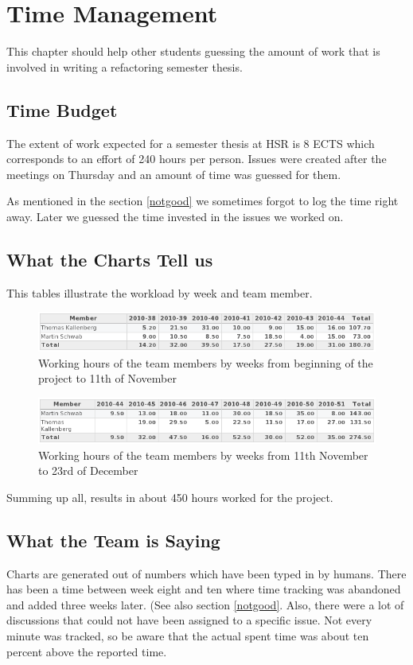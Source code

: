 \chapter{Time Management}
\thispagestyle{fancy}
This chapter should help other students guessing the amount of work that is 
involved in writing a refactoring semester thesis.

\section{Time Budget}
The extent of work expected for a semester thesis at HSR is 8 ECTS which 
corresponds to an effort of 240 hours per person. Issues were created after 
the meetings on Thursday and an amount of time was guessed for them.

As mentioned in the section \ref{notgood} we sometimes forgot to log the time
right away. Later we guessed the time invested in the issues we worked on.

\section{What the Charts Tell us}
This tables illustrate the workload by week and team member.

\begin{figure}[h]
\includegraphics[width=1\textwidth]{images/timetable1.png}
\caption{Working hours of the team members by weeks from beginning of the
project to 11th of November}
\label{timetable1}
\end{figure}

\begin{figure}[h]
\includegraphics[width=1\textwidth]{images/timetable2.png}
\caption{Working hours of the team members by weeks from 11th November to 23rd
of December}
\label{timetable2}
\end{figure}

Summing up all, results in about 450 hours worked for the project.

\section{What the Team is Saying}
Charts are generated out of numbers which have been typed in by humans. There 
has been a time between week eight and ten where time tracking was abandoned and 
added three weeks later. (See also section \ref{notgood}. Also, there were a lot
of discussions that could not have been assigned to a specific issue. Not every
minute was tracked, so be aware that the actual spent time was about ten percent
above the reported time.
